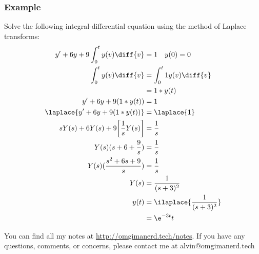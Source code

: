 \documentclass{math}
\begin{document}
\subsubsection*{Example}
Solve the following integral-differential equation using the method of Laplace
transforms:
\begin{align*}
  y'+6y+9\int_{0}^{t}y(v)\diff{v} &= 1 \quad y(0) = 0 \\
  \int_{0}^{t}y(v)\diff{v} &= \int_{0}^{t}1y(v)\diff{v} \\
  &= 1*y(t) \\
  y'+6y+9(1*y(t)) &= 1 \\
  \laplace{y'+6y+9(1*y(t))} &= \laplace{1} \\
  sY(s)+6Y(s)+9\bigg[\frac{1}{s}Y(s)\bigg] &= \frac{1}{s} \\
  Y(s)(s+6+\frac{9}{s}) &= \frac{1}{s} \\
  Y(s)(\frac{s^2+6s+9}{s}) &= \frac{1}{s} \\
  Y(s) &= \frac{1}{(s+3)^2} \\
  y(t) &= \ilaplace{\frac{1}{(s+3)^2}} \\
  &= \e^{-3t}t
\end{align*}

\begin{center}
  You can find all my notes at \url{http://omgimanerd.tech/notes}. If you have
  any questions, comments, or concerns, please contact me at
  alvin@omgimanerd.tech
\end{center}
\end{document}
